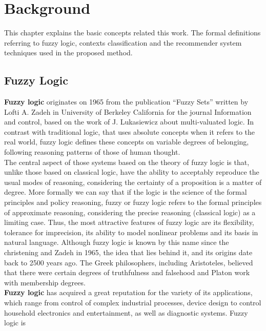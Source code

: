 
\chapter{Background}

This chapter explains the basic concepts related this work. The formal
definitions referring to fuzzy logic, contexts classification and the
recommender system techniques used in the proposed method.

\section{Fuzzy Logic}

\textbf{Fuzzy logic} originates on 1965 from the publication “Fuzzy
Sets”\cite{zadeh1965fuzzy} written by Lofti A. Zadeh in University of
Berkeley California for the journal Information and control, based on
the work of J. Lukasiewicz\cite{saffiotti1995multivalued} about
multi-valuated logic. In contrast with traditional logic, that uses
absolute concepts when it refers to the real world, fuzzy logic
defines these concepts on variable degrees of belonging, following
reasoning patterns of those of human thought. \\  
The central aspect of those systems based on the theory of fuzzy logic
is that, unlike those based on classical logic, have the ability to
acceptably reproduce the usual modes of reasoning, considering the
certainty of a proposition is a matter of degree. More formally we can
say that if the logic is the science of the formal principles and
policy reasoning, fuzzy or fuzzy logic refers to the formal principles
of approximate reasoning, considering the precise reasoning (classical
logic) as a limiting case. Thus, the most attractive features of fuzzy
logic are its flexibility, tolerance for imprecision, its ability to
model nonlinear problems and its basis in natural language. Although
fuzzy logic is known by this name since the christening and Zadeh in
1965, the idea that lies behind it, and its origins date back to 2500
years ago. The Greek philosophers, including Aristoteles, believed
that there were certain degrees of truthfulness and falsehood and
Platon work with membership degrees.\\
\textbf{Fuzzy logic} has acquired a great reputation for the variety
of its applications, which range from control of complex industrial
processes, device design to control household electronics and
entertainment, as well as diagnostic systems.  Fuzzy logic is
